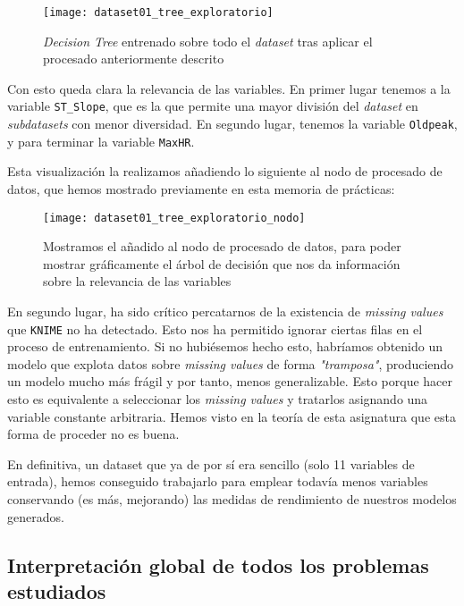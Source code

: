 \documentclass[11pt]{article}
\begin{document}
\begin{figure}[H]
    \centering
    \texttt{[image: dataset01\_tree\_exploratorio]}
    \caption{\emph{Decision Tree} entrenado sobre todo el \emph{dataset} tras aplicar el procesado anteriormente descrito}
    \label{workflow_general:imagen}
\end{figure}

Con esto queda clara la relevancia de las variables. En primer lugar tenemos a la variable \lstinline{ST_Slope}, que es la que permite una mayor división del \emph{dataset} en \emph{subdatasets} con menor diversidad. En segundo lugar, tenemos la variable \lstinline{Oldpeak}, y para terminar la variable \lstinline{MaxHR}.

Esta visualización la realizamos añadiendo lo siguiente al nodo de procesado de datos, que hemos mostrado previamente en esta memoria de prácticas:

\begin{figure}[H]
    \centering
    \texttt{[image: dataset01\_tree\_exploratorio\_nodo]}
    \caption{Mostramos el añadido al nodo de procesado de datos, para poder mostrar gráficamente el árbol de decisión que nos da información sobre la relevancia de las variables}
\end{figure}

En segundo lugar, ha sido crítico percatarnos de la existencia de \emph{missing values} que \lstinline{KNIME} no ha detectado. Esto nos ha permitido ignorar ciertas filas en el proceso de entrenamiento. Si no hubiésemos hecho esto, habríamos obtenido un modelo que explota datos sobre \emph{missing values} de forma \emph{"tramposa"}, produciendo un modelo mucho más frágil y por tanto, menos generalizable. Esto porque hacer esto es equivalente a seleccionar los \emph{missing values} y tratarlos asignando una variable constante arbitraria. Hemos visto en la teoría de esta asignatura que esta forma de proceder no es buena.

En definitiva, un dataset que ya de por sí era sencillo (solo 11 variables de entrada), hemos conseguido trabajarlo para emplear todavía menos variables conservando (es más, mejorando) las medidas de rendimiento de nuestros modelos generados.

\pagebreak

\subsection{Interpretación global de todos los problemas estudiados}



\pagebreak



\end{document}
